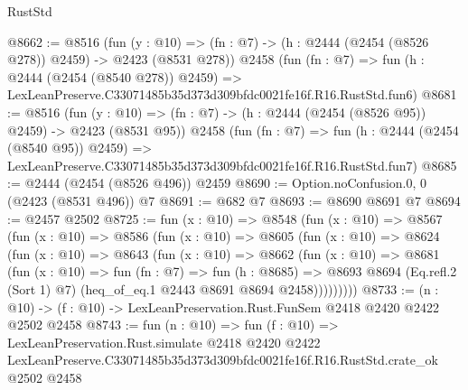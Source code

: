 \begin{lexlean}{RustStd}
\begin{coremodule}
@8662 := @8516
    (fun (y : @10) => (fn : @7) -> (h : @2444 (@2454 (@8526 @278)) @2459) -> @2423 (@8531 @278))
    @2458
    (fun (fn : @7) =>
    fun (h : @2444 (@2454 (@8540 @278)) @2459) =>
    LexLeanPreserve.C33071485b35d373d309bfdc0021fe16f.R16.RustStd.fun6)
@8681 := @8516
    (fun (y : @10) => (fn : @7) -> (h : @2444 (@2454 (@8526 @95)) @2459) -> @2423 (@8531 @95))
    @2458
    (fun (fn : @7) =>
    fun (h : @2444 (@2454 (@8540 @95)) @2459) =>
    LexLeanPreserve.C33071485b35d373d309bfdc0021fe16f.R16.RustStd.fun7)
@8685 := @2444 (@2454 (@8526 @496)) @2459
@8690 := Option.noConfusion.{0, 0} (@2423 (@8531 @496)) @7
@8691 := @682 @7
@8693 := @8690 @8691 @7
@8694 := @2457 @2502
@8725 := fun (x : @10) =>
  @8548
    (fun (x : @10) =>
    @8567
      (fun (x : @10) =>
      @8586
        (fun (x : @10) =>
        @8605
          (fun (x : @10) =>
          @8624
            (fun (x : @10) =>
            @8643
              (fun (x : @10) =>
              @8662
                (fun (x : @10) =>
                @8681
                  (fun (x : @10) =>
                  fun (fn : @7) =>
                  fun (h : @8685) =>
                  @8693
                    @8694
                    (Eq.refl.{2} (Sort 1) @7)
                    (heq_of_eq.{1} @2443 @8691 @8694 @2458)))))))))
@8733 := (n : @10) -> (f : @10) -> LexLeanPreservation.Rust.FunSem @2418 @2420 @2422 @2502 @2458
@8743 := fun (n : @10) =>
  fun (f : @10) =>
  LexLeanPreservation.Rust.simulate
    @2418
    @2420
    @2422
    LexLeanPreserve.C33071485b35d373d309bfdc0021fe16f.R16.RustStd.crate_ok
    @2502
    @2458
\end{coremodule}
\end{lexlean}
